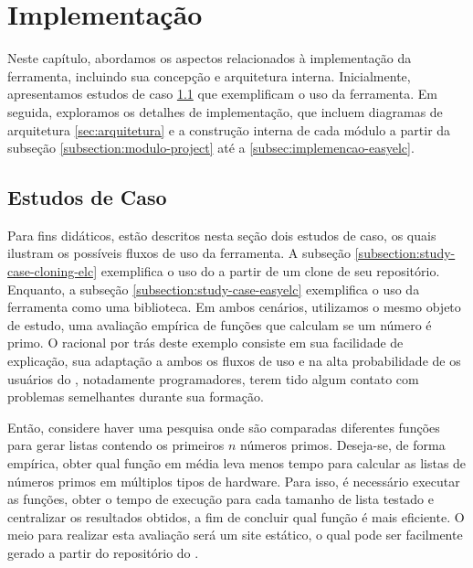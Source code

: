 \documentclass[12pt]{tcc}
\begin{document}
\chapter{Implementação}
	\label{cap:implementação}


	Neste capítulo, abordamos os aspectos relacionados à implementação da ferramenta, incluindo sua concepção e arquitetura interna.
	Inicialmente, apresentamos estudos de caso \ref{sec:estudos-de-caso} que exemplificam o uso da ferramenta.
	Em seguida, exploramos os detalhes de implementação, que incluem diagramas de arquitetura \ref{sec:arquitetura} e a construção interna de cada módulo a partir da subseção \ref{subsection:modulo-project} até a \ref{subsec:implemencao-easyelc}.

	\section{Estudos de Caso}
	\label{sec:estudos-de-caso}

	Para fins didáticos, estão descritos nesta seção dois estudos de caso, os quais ilustram os possíveis fluxos de uso da ferramenta.
	A subseção \ref{subsection:study-case-cloning-elc} exemplifica o uso do  a partir de um clone de seu repositório.
	Enquanto, a subseção \ref{subsection:study-case-easyelc} exemplifica o uso da ferramenta como uma biblioteca. 
	Em ambos cenários, utilizamos o mesmo objeto de estudo, uma avaliação empírica de funções que calculam se um número é primo.
	O racional por trás deste exemplo consiste em sua facilidade de explicação, sua adaptação a ambos os fluxos de uso e na alta probabilidade de os usuários do , notadamente programadores, terem tido algum contato com problemas semelhantes durante sua formação.

	Então, considere haver uma pesquisa onde são comparadas diferentes funções para gerar listas contendo os primeiros $n$ números primos. 
	Deseja-se, de forma empírica, obter qual função em média leva menos tempo para calcular as listas de números primos em múltiplos tipos de hardware.
	Para isso, é necessário executar as funções, obter o tempo de execução para cada tamanho de lista testado e centralizar os resultados obtidos, a fim de concluir qual função é mais eficiente.
	O meio para realizar esta avaliação será um site estático, o qual pode ser facilmente gerado a partir do repositório do .
\end{document}
